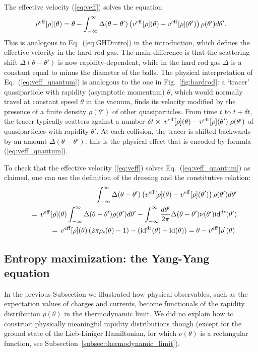 \documentclass[onecolumn,amsfonts,showpacs,superscriptaddress]{revtex4-1}
\begin{document}
The effective velocity (\ref{eq:veff}) solves the equation
\begin{equation}
    \label{eq:veff_quantum}
\displaystyle v^{\rm eff}[\rho] (\theta) = \theta - \int_{-\infty}^\infty \Delta(\theta- \theta')  \left(  v^{\rm eff}[\rho] (\theta)  - v^{\rm eff}[\rho] (\theta') \right) \rho(\theta') d\theta' .
\end{equation}
This is analogous to Eq.~(\ref{eq:GHDintro}) in the introduction, which defines the effective velocity in the hard rod gas. The main difference is that the scattering shift $\Delta(\theta-\theta')$ is now rapidity-dependent, while in the hard rod gas $\Delta$ is a constant equal to minus the diameter of the balls. The physical interpretation of Eq.~(\ref{eq:veff_quantum}) is analogous to the one in Fig.~\ref{fig:hardrod}: a `tracer' quasiparticle with rapidity (asymptotic momentum) $\theta$, which would normally travel at constant speed $\theta$ in the vacuum, finds its velocity modified by the presence of a finite density $\rho(\theta')$ of other quasiparticles. From time $t$ to $t+ \delta t$, the tracer typically scatters against a number $\delta t \times | v^{\rm eff}[\rho] (\theta)  - v^{\rm eff}[\rho] (\theta') | \rho(\theta')$ of quasiparticles with rapidity $\theta'$. At each collision, the tracer is shifted backwards by an amount $\Delta (\theta-\theta')$: this is the physical effect that is encoded by formula (\ref{eq:veff_quantum}).


To check that the effective velocity (\ref{eq:veff}) solves Eq.~(\ref{eq:veff_quantum}) as claimed, one can use the definition of the dressing and the constitutive relation:
\begin{eqnarray*}
    && \int_{-\infty}^\infty \Delta(\theta- \theta')  \left(  v^{\rm eff}[\rho] (\theta)  - v^{\rm eff}[\rho] (\theta') \right) \rho(\theta') d\theta' \\
    &&= \,  v^{\rm eff}[\rho] (\theta)  \int_{-\infty}^\infty \Delta(\theta- \theta')  \rho(\theta') d\theta' - \int_{-\infty}^\infty \frac{d\theta'}{2\pi} \Delta(\theta- \theta')  \nu(\theta') {\rm id}^{\rm dr} (\theta')   \\
    &&= \,  v^{\rm eff}[\rho] (\theta) \, (2\pi \rho_{\rm s}(\theta) - 1 ) - ( {\rm id}^{\rm dr} (\theta) - {\rm id} (\theta)  )  = \theta -  v^{\rm eff}[\rho] (\theta) .
\end{eqnarray*}


\subsection{Entropy maximization: the Yang-Yang equation}
\label{subsec:yangyang}
In the previous Subsection we illustrated how physical observables, such as the expectation values of charges and currents, become functionals of the rapidity distribution $\rho(\theta)$ in the thermodynamic limit. We did no explain how to construct physically meaningful rapidity distributions though (except for the ground state of the Lieb-Liniger Hamiltonian, for which $\nu(\theta)$ is a rectangular function, see Subsection~\ref{subsec:thermodynamic_limit}).
\end{document}
